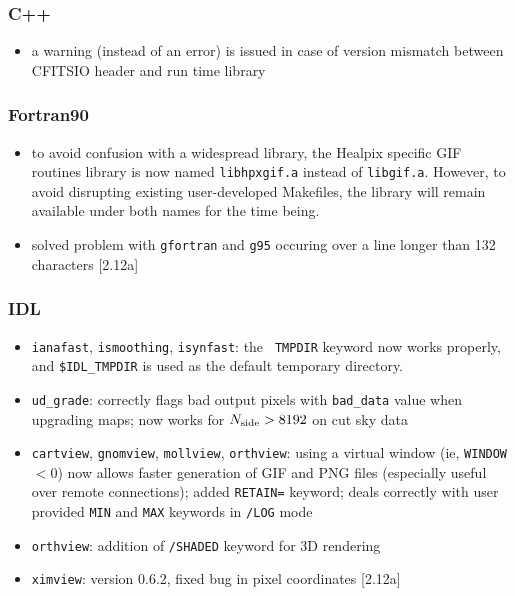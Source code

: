 \documentclass[12pt,twoside]{article}
\newcommand{\nside}{{N_{\rm side}}}
\begin{document}

\subsubsection[C++]{C++}
	\begin{itemize}
	\item a warning (instead of an error) is issued in case of version
mismatch between CFITSIO header and run time library
	\end{itemize}

\subsubsection[Fortran90]{Fortran90}
	\begin{itemize}
	\item to avoid confusion with a widespread library, 
	the Healpix specific GIF routines library is now named {\tt libhpxgif.a} instead of
	{\tt libgif.a}. However, to avoid disrupting existing user-developed
	Makefiles, the library will remain available under both names
for the time being.
	\item solved problem with {\tt gfortran} and {\tt g95}
occuring over a line longer than 132 characters [2.12a]
	\end{itemize}

\subsubsection[IDL]{IDL}
	\begin{itemize}
	\item {\tt ianafast}, {\tt ismoothing}, {\tt isynfast}: the {\tt
TMPDIR} keyword now works properly, and {\tt \$IDL\_TMPDIR} is used as the
default temporary directory.
	\item {\tt ud\_grade}: correctly flags bad output pixels with {\tt bad\_data}
value when upgrading maps; now works for
$\nside >  8192$ on cut sky data
	\item {\tt cartview}, {\tt gnomview}, {\tt mollview}, {\tt orthview}:
using a virtual window (ie, {\tt WINDOW}$<0$) now allows faster generation 
of GIF and PNG files (especially useful over remote connections); 
added {\tt RETAIN=} keyword; deals correctly with user provided 
{\tt MIN} and {\tt MAX} keywords in {\tt /LOG} mode
	\item {\tt orthview}: addition of {\tt /SHADED} keyword for 3D
rendering
	\item {\tt ximview}: version 0.6.2, fixed bug in pixel
coordinates [2.12a]
	\end{itemize}
\end{document}
